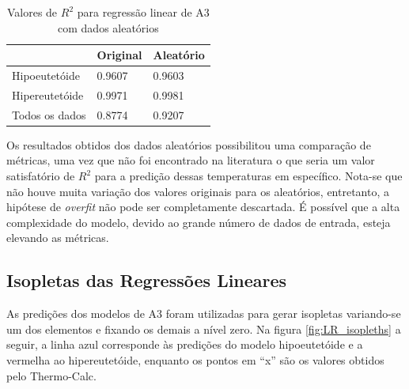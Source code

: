 \documentclass[brazil,tf,epusp]{usp}  %
\begin{document}
\begin{table}
  \caption{Valores de $R^{2}$ para regressão linear de A3 com dados aleatórios}

  \begin{tabular}{lll}
  \hline
                 & Original & Aleatório \\
  \hline
  Hipoeutetóide  & 0.9607   & 0.9603    \\
  Hipereutetóide & 0.9971   & 0.9981    \\
  Todos os dados & 0.8774   & 0.9207    \\
  \hline
  \end{tabular}

  \label{tab:r2_A3_RL_random}
\end{table}

Os resultados obtidos dos dados aleatórios possibilitou uma comparação de métricas, uma vez que não foi encontrado na literatura o que seria um valor satisfatório de $R^{2}$ para a predição dessas temperaturas em específico. Nota-se que não houve muita variação dos valores originais para os aleatórios, entretanto, a hipótese de \textit{overfit} não pode ser completamente descartada. É possível que a alta complexidade do modelo, devido ao grande número de dados de entrada, esteja elevando as métricas.

\subsection{Isopletas das Regressões Lineares}

As predições dos modelos de A3 foram utilizadas para gerar isopletas variando-se um dos elementos e fixando os demais a nível zero. Na figura \ref{fig:LR_isopleths} a seguir, a linha azul corresponde às predições do modelo hipoeutetóide e a vermelha ao hipereutetóide, enquanto os pontos em ``x'' são os valores obtidos pelo Thermo-Calc\textregistered{}.
\end{document}
